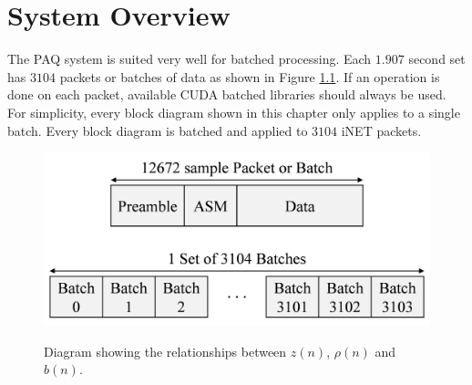 

\chapter{System Overview}
\label{sec:systemOverview}




The PAQ system is suited very well for batched processing.
Each $1.907$ second set has $3104$ packets or batches of data as shown in Figure \ref{fig:packet_batch_set}.
If an operation is done on each packet, available CUDA batched libraries should always be used.
For simplicity, every block diagram shown in this chapter only applies to a single batch.
Every block diagram is batched and applied to $3104$ iNET packets.
\begin{figure}
	\caption{Diagram showing the relationships between $z(n)$, $\rho(n)$ and $b(n)$.}
	\centering\includegraphics[width=5.94in/100*55]{figures/eq_GPUimplementation/packet_batch_set.pdf}
	\label{fig:packet_batch_set}
\end{figure}

